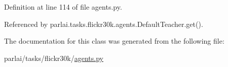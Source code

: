 Definition at line 114 of file agents.\+py.



Referenced by parlai.\+tasks.\+flickr30k.\+agents.\+Default\+Teacher.\+get().



The documentation for this class was generated from the following file\+:\begin{DoxyCompactItemize}
\item 
parlai/tasks/flickr30k/\hyperlink{parlai_2tasks_2flickr30k_2agents_8py}{agents.\+py}\end{DoxyCompactItemize}
